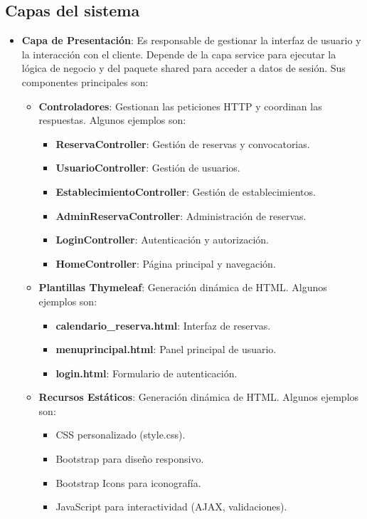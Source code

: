 \subsection{Capas del sistema}
\begin{itemize}
	\item \textbf{Capa de Presentación}: Es responsable de gestionar la interfaz de usuario y la interacción con el cliente. Depende de la capa service para ejecutar la lógica de negocio y del paquete shared para acceder a datos de sesión. Sus componentes principales son:
    	\begin{itemize}
            \item \textbf{Controladores}: Gestionan las peticiones HTTP y coordinan las respuestas. Algunos ejemplos son:
        	\begin{itemize}
                \item \textbf{ReservaController}: Gestión de reservas y convocatorias.
                \item \textbf{UsuarioController}: Gestión de usuarios.
                \item \textbf{EstablecimientoController}: Gestión de establecimientos.
                \item \textbf{AdminReservaController}: Administración de reservas.
                \item \textbf{LoginController}: Autenticación y autorización.
                \item \textbf{HomeController}: Página principal y navegación.
             \end{itemize}

            \item \textbf{Plantillas Thymeleaf}: Generación dinámica de HTML. Algunos ejemplos son:
            \begin{itemize}
               \item \textbf{calendario\_reserva.html}: Interfaz de reservas.
               \item \textbf{menuprincipal.html}: Panel principal de usuario.
               \item \textbf{login.html}: Formulario de autenticación.
            \end{itemize}

            \item \textbf{Recursos Estáticos}: Generación dinámica de HTML. Algunos ejemplos son:
            \begin{itemize}
               \item CSS personalizado (style.css).
               \item Bootstrap para diseño responsivo.
               \item Bootstrap Icons para iconografía.
               \item JavaScript para interactividad (AJAX, validaciones).
            \end{itemize}


\end{itemize}
\end{itemize}
